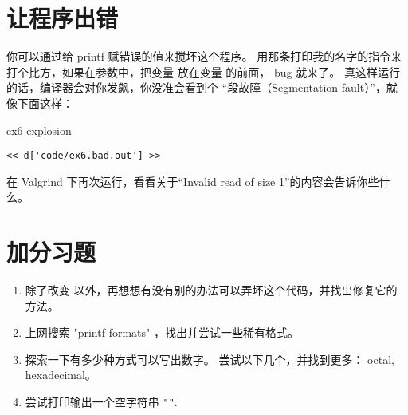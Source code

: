 \section{让程序出错}

你可以通过给 printf 赋错误的值来搅坏这个程序。 用那条打印我的名字的指令来打个比方，如果在参数中，把变量  放在变量  的前面， bug 就来了。 真这样运行的话，编译器会对你发飙，你没准会看到个
“段故障（Segmentation fault）”，就像下面这样：

\begin{code}{ex6 explosion}
\begin{lstlisting}
<< d['code/ex6.bad.out'] >>
\end{lstlisting}
\end{code}

在 Valgrind 下再次运行，看看关于“Invalid read of size 1”的内容会告诉你些什么。


\section{加分习题}

\begin{enumerate}
\item 除了改变  以外，再想想有没有别的办法可以弄坏这个代码，并找出修复它的方法。
\item 上网搜索 "printf formats" ，找出并尝试一些稀有格式。
\item 探索一下有多少种方式可以写出数字。 尝试以下几个，并找到更多： octal, hexadecimal。
\item 尝试打印输出一个空字符串 \verb|""|.
\end{enumerate}

